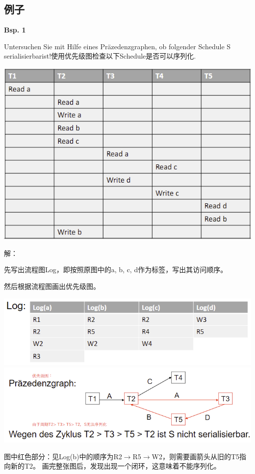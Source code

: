 \documentclass[fleqn]{article}
\begin{document}
\subsection{例子}

\noindent\textbf{Bsp. 1}

\noindent Untersuchen Sie mit Hilfe eines Präzedenzgraphen, ob folgender Schedule S serialisierbarist!使用优先级图检查以下Schedule是否可以序列化.

\begin{center}
    \includegraphics[scale=0.5]{41.png}
\end{center}

\noindent 解：

先写出流程图Log，即按照原图中的a, b, c, d作为标签，写出其访问顺序。

然后根据流程图画出优先级图。

\begin{center}
    \includegraphics[scale=0.5]{42.png}
    \includegraphics[scale=0.5]{43.png}
\end{center}

图中红色部分：见Log(b)中的顺序为R2$\rightarrow$R5$\rightarrow$W2，则需要画箭头从旧的T5指向新的T2。
画完整张图后，发现出现一个闭环，这意味着不能序列化。
\end{document}
